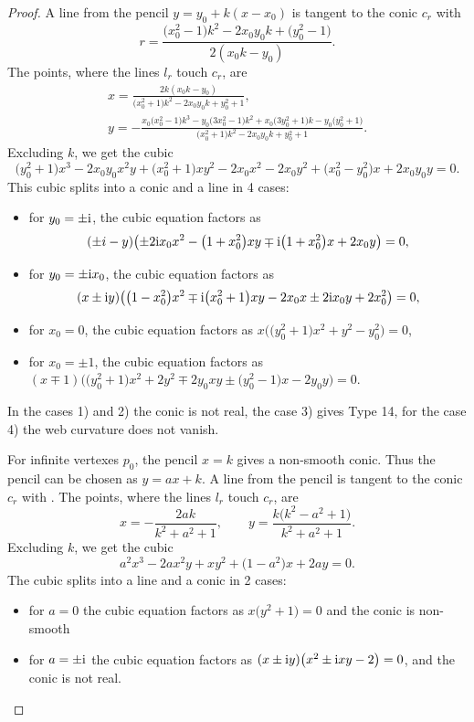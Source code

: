 \documentclass[pdftex]{sigma}
\numberwithin{equation}{section}
\begin{document}
\begin{proof}
A line from the pencil $y=y_0+k(x-x_0)$ is tangent to the conic $c_r$ with
\[
r=\frac{\bigl(x_0^2 - 1\bigr)k^2 - 2x_0y_0k + \bigl(y_0^2 - 1\bigr)}{2(x_0k - y_0)}.
\]
 The points, where the lines $l_r$ touch $c_r$, are
\begin{gather*}
x=\frac{2k(x_0k - y_0)}{\bigl(x_0^2 + 1\bigr)k^2 - 2x_0y_0k + y_0^2 + 1},\\
y=-\frac{x_0\bigl(x_0^2 - 1\bigr)k^3 - y_0\bigl(3x_0^2 - 1\bigr)k^2 + x_0\bigl(3y_0^2 + 1\bigr)k - y_0\bigl(y_0^2 + 1\bigr)}{\bigl(x_0^2 + 1\bigr)k^2 - 2x_0y_0k + y_0^2 + 1}.
\end{gather*}
Excluding $k$, we get the cubic
\[
\bigl(y_0^2 + 1\bigr)x^3 - 2x_0y_0x^2y+ \bigl(x_0^2 + 1\bigr)xy^2 - 2x_0x^2 - 2x_0y^2 + \bigl(x_0^2 - y_0^2\bigr)x + 2x_0y_0y=0.
\]
This cubic splits into a conic and a line in 4
 cases:
 \begin{itemize}
\item[(1)] for $y_0=\pm {\rm i}$, the cubic equation factors as
\[
(\pm i-y)\bigl(\pm 2{\rm i}x_0x^2 -\bigl(1+x_0^2\bigr)xy \mp {\rm i}\bigl(1+x_0^2\bigr)x + 2x_0y\bigr)=0,
\]
\item[(2)] for $y_0=\pm {\rm i}x_0$, the cubic equation factors as
\[
 (x \pm {\rm i} y)\bigl(\bigl(1-x_0^2\bigr)x^2 \mp {\rm i} \bigl(x_0^2+1\bigr)xy - 2x_0x \pm2 {\rm i} x_0y + 2x_0^2\bigr)=0,
\]
\item[(3)] for $x_0=0$, the cubic equation factors as $x\bigl(\bigl(y_0^2 + 1\bigr)x^2 + y^2 - y_0^2\bigr)=0$,
\item[(4)] for $x_0=\pm 1$, the cubic equation factors as $(x\mp 1)\bigl(\bigl(y_0^2 + 1\bigr)x^2+2y^2 \mp 2y_0xy \pm \bigl(y_0^2 - 1\bigr)x - 2y_0y\bigr)=0$.
 \end{itemize}
In the cases 1) and 2) the conic is not real, the case 3) gives Type 14, for the case 4) the web curvature does not vanish.



For infinite vertexes $p_0$, the pencil $x=k$ gives a non-smooth conic. Thus the pencil can be chosen as $y=ax+k$. A line from the pencil is tangent to the conic $c_r$ with
.
 The points, where the lines $l_r$ touch $c_r$, are
\[
x=-\frac{2ak}{k^2+a^2+1}, \qquad y=\frac{k\bigl( k^2-a^2 + 1\bigr)}{k^2+a^2+1}.
\]
Excluding $k$, we get the cubic
\[
a^2x^3 - 2ax^2y + xy^2 +\bigl(1-a^2\bigr)x + 2ay=0.
\]
The cubic splits into a line and a conic in 2 cases:
\begin{itemize}
\item[(1)] for $a=0$ the cubic equation factors as $x\bigl(y^2+1\bigr)=0$ and the conic is non-smooth
\item[(2)] for $a=\pm {\rm i}$ the cubic equation factors as $(x \pm {\rm i} y)\bigl(x^2 \pm {\rm i} xy-2\bigr)=0$, and the conic is not real.
\end{itemize}



\end{proof}
\end{document}
